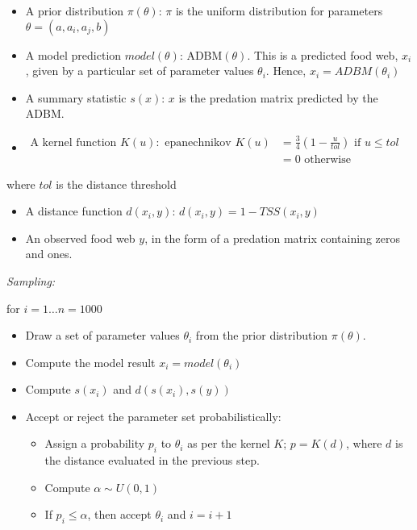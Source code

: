 \documentclass{article}
\begin{document}
\begin{itemize}
\item
  A prior distribution \(\pi(\theta)\): \(\pi\) is the uniform
  distribution for parameters \(\theta = (a, a_i, a_j, b)\)
\item
  A model prediction \(model(\theta)\): ADBM\((\theta)\). This is a
  predicted food web, \(x_i\), given by a particular set of parameter
  values \(\theta_i\). Hence, \(x_i = ADBM(\theta_i)\)
\item
  A summary statistic \(s(x)\): \(x\) is the predation matrix predicted
  by the ADBM.
\item
  \(\begin{aligned} \text{A kernel function } K(u): \text{ epanechnikov } K(u) &= \frac{3}{4}(1-\frac{u}{tol}) \text{ if } u \leq tol \\ &= 0 \text{ otherwise} \end{aligned}\)
\end{itemize}

where \(tol\) is the distance threshold

\begin{itemize}
\item
  A distance function \(d(x_i,y)\): \(d(x_i,y) = 1 - TSS(x_i,y)\)
\item
  An observed food web \(y\), in the form of a predation matrix
  containing zeros and ones.
\end{itemize}

\emph{Sampling:}

for \(i = 1 \dots n = 1000\)

\begin{itemize}
\item
  Draw a set of parameter values \(\theta_i\) from the prior
  distribution \(\pi(\theta)\).
\item
  Compute the model result \(x_i = model(\theta_i)\)
\item
  Compute \(s(x_i)\) and \(d(s(x_i), s(y))\)
\item
  Accept or reject the parameter set probabilistically:

  \begin{itemize}
  \item
    Assign a probability \(p_i\) to \(\theta_i\) as per the kernel
    \(K\); \(p = K(d)\), where \(d\) is the distance evaluated in the
    previous step.
  \item
    Compute \(\alpha \sim U(0,1)\)
  \item
    If \(p_i \leq \alpha\), then accept \(\theta_i\) and \(i = i + 1\)
  \end{itemize}
\end{itemize}
\end{document}
